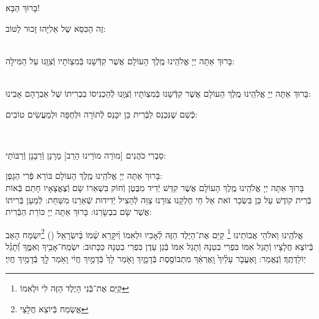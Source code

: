 \documentclass[twoside, openany, parskip=half, 11pt]{book}
\begin{document}
\begin{Large}
בָּרוּךְ הַבָּא!

\end{Large}

זֶה הַכִּסֵּא שֶׁל אֵלִיָּהוּ זָכוּר לַטּוֹב:


\\
בָּרוּךְ אַתָּה יְיָ אֱלֹהֵֽינוּ מֶֽלֶךְ הָעוֹלָם אֲשֶׁר קִדְּֿשָׁנוּ בְּֿמִצְוֹתָיו וְֿצִוָּֽנוּ עַל הַמִּילָה:

\\
בָּרוּךְ אַתָּה יְיָ אֱלֹהֵֽינוּ מֶֽלֶךְ הָעוֹלָם אֲשֶׁר קִדְּֿשָׁנוּ בְּֿמִצְוֹתָיו וְֿצִוָּֽנוּ לְֿהַכְנִיסוֹ בִבְרִיתוֹ שֶׁל אַבְרָהָם אָבִינוּ:

\kahal
כְּֿשֵׁם שֶׁנִּכְנַס לַבְּֿרִית כֵּן יִכָּנֵס לְֿתוֹרָה וּלְחֻפָּה וּלְמַעֲשִׂים טוֹבִים:

\\
\begin{footnotesize}
סַבְרִי כֹּהֲנִים [מוׂרֵה מוׂרֵינוּ הָרַב] מָרָנָן וְֿרַבָנָן וְֿרַבּוׂתַי:\\
\end{footnotesize}
בָּרוּךְ אַתָּה יְיָ אֱלֹהֵֽינוּ מֶֽלֶךְ הָעוֹלָם בּוֹרֵא פְּֿרִי הַגָפֶן:\\
בָּרוּךְ אַתָּה יְיָ אֱלֹהֵֽינוּ מֶֽלֶךְ הָעוֹלָם אֲשֶׁר קִדַּשׁ יְֿדִיד מִבֶּטֶן וְֿחוֹק בִּשְׁאֵרוֹ שָׂם וְֿצֶאֱצָאָיו חָתַם בְּֿאוֹת בְּֿרִית קוֹדֶשׁ עַל כֵּן בִּשְׂכַר זֹאת אֵל חַי חֶלְקֵנוּ צוּרֵנוּ צַוֵּה לְֿהַצִיל יְֿדִידוּת שְֿׁאֵרֵנוּ מִשַּׁחַת: לְֿמַעַן בְּֿרִיתוֹ אֲשֶׁר שָׂם בִבְשָׂרֵנוּ: בָּרוּךְ אַתָּה יְיָ כּוֹרֵת הַבְּֿרִית:

אֱלֹהֵֽינוּ וֵאלֹהֵי אֲבוֹתֵינוּ \footnote{
קַיֵּם אֶת־בְּֿנִי הַיֶלֶד הַזֶּה לִי וּלְאִמוֹ} קַיֵּם אֶת־הַיֶּלֶד הַזֶּה לְֿאָבִיו וּלְאִמוֹ וְֿיִקָּרֵא שְֿׁמוֹ בְּֿיִשְׂרָאֵל () \footnote{
אֱשְׂמַח בְּֿיוֹצֵא חֲלָצַי}יִשְׂמַח הָאַב בְּֿיוֹצֵא חֲלָצָיו וְֿתָגֵל אִמּוֹ בִּפְרִי בִטְנָהּ וְֿתָגֵל אִמּוֹ בְּֿגַן עֵדֶן בִּפְרִי בִטְנָהּ
כַּכָּתוּב: יִשְׂמַֽח־אָבִ֥יךָ וְאִמֶּ֑ךָ וְֿ֝תָגֵ֗ל יֽוֹלַדְתֶּֽךָ׃
וְֿנֶאֱמַר: וָאֶעֱבֹ֤ר עָלַ֨יִךְ֙ וָֽאֶרְאֵ֔ךְ מִתְבּוֹסֶ֖סֶת בְּֿדָמָ֑יִךְ
וָאֹ֤מַר לָךְ֙ בְּֿדָמַ֣יִךְ חֲיִ֔י וָאֹ֥מַר לָ֖ךְ בְּֿדָמַ֥יִךְ חֲיִֽי׃
\end{document}

